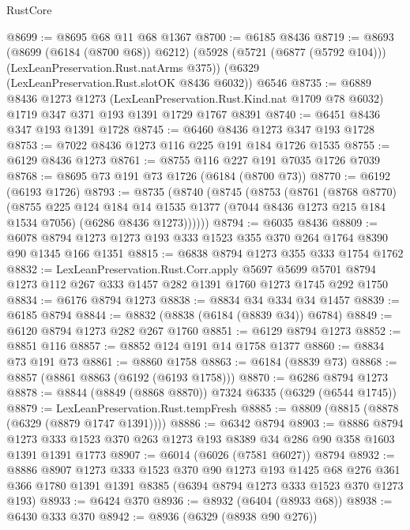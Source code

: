 \begin{lexlean}{RustCore}
\begin{coremodule}
@8699 := @8695 @68 @11 @68 @1367
@8700 := @6185 @8436
@8719 := @8693
    (@8699 (@6184 (@8700 @68)) @6212)
    (@5928 (@5721 (@6877 (@5792 @104))) (LexLeanPreservation.Rust.natArms @375))
    (@6329 (LexLeanPreservation.Rust.slotOK @8436 @6032))
    @6546
@8735 := @6889
    @8436
    @1273
    @1273
    (LexLeanPreservation.Rust.Kind.nat @1709 @78 @6032)
    @1719
    @347
    @371
    @193
    @1391
    @1729
    @1767
    @8391
@8740 := @6451 @8436 @347 @193 @1391 @1728
@8745 := @6460 @8436 @1273 @347 @193 @1728
@8753 := @7022 @8436 @1273 @116 @225 @191 @184 @1726 @1535
@8755 := @6129 @8436 @1273
@8761 := @8755 @116 @227 @191 @7035 @1726 @7039
@8768 := @8695 @73 @191 @73 @1726 (@6184 (@8700 @73))
@8770 := @6192 (@6193 @1726)
@8793 := @8735
    (@8740
      (@8745
        (@8753
          (@8761
            (@8768 @8770)
            (@8755
              @225
              @124
              @184
              @14
              @1535
              @1377
              (@7044 @8436 @1273 @215 @184 @1534 @7056)
              (@6286 @8436 @1273))))))
@8794 := @6035 @8436
@8809 := @6078 @8794 @1273 @1273 @193 @333 @1523 @355 @370 @264 @1764 @8390 @90 @1345 @166 @1351
@8815 := @6838 @8794 @1273 @355 @333 @1754 @1762
@8832 := LexLeanPreservation.Rust.Corr.apply
    @5697
    @5699
    @5701
    @8794
    @1273
    @112
    @267
    @333
    @1457
    @282
    @1391
    @1760
    @1273
    @1745
    @292
    @1750
@8834 := @6176 @8794 @1273
@8838 := @8834 @34 @334 @34 @1457
@8839 := @6185 @8794
@8844 := @8832 (@8838 (@6184 (@8839 @34)) @6784)
@8849 := @6120 @8794 @1273 @282 @267 @1760
@8851 := @6129 @8794 @1273
@8852 := @8851 @116
@8857 := @8852 @124 @191 @14 @1758 @1377
@8860 := @8834 @73 @191 @73
@8861 := @8860 @1758
@8863 := @6184 (@8839 @73)
@8868 := @8857 (@8861 @8863 (@6192 (@6193 @1758)))
@8870 := @6286 @8794 @1273
@8878 := @8844 (@8849 (@8868 @8870)) @7324 @6335 (@6329 (@6544 @1745))
@8879 := LexLeanPreservation.Rust.tempFresh
@8885 := @8809 (@8815 (@8878 (@6329 (@8879 @1747 @1391))))
@8886 := @6342 @8794
@8903 := @8886
    @8794
    @1273
    @333
    @1523
    @370
    @263
    @1273
    @193
    @8389
    @34
    @286
    @90
    @358
    @1603
    @1391
    @1391
    @1773
@8907 := @6014 (@6026 (@7581 @6027)) @8794
@8932 := @8886
    @8907
    @1273
    @333
    @1523
    @370
    @90
    @1273
    @193
    @1425
    @68
    @276
    @361
    @366
    @1780
    @1391
    @1391
    @8385
    (@6394 @8794 @1273 @333 @1523 @370 @1273 @193)
@8933 := @6424 @370
@8936 := @8932 (@6404 (@8933 @68))
@8938 := @6430 @333 @370
@8942 := @8936 (@6329 (@8938 @90 @276))

\end{coremodule}
\end{lexlean}
